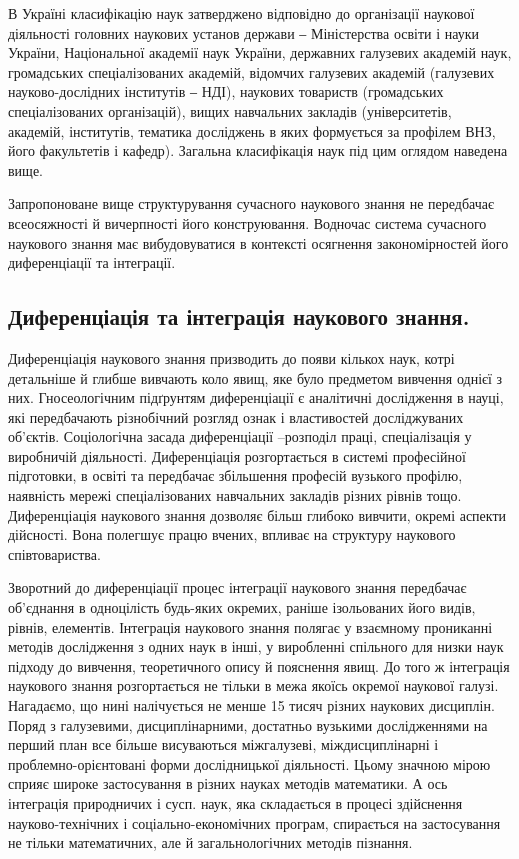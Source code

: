 В Україні класифікацію наук затверджено відповідно до організації
наукової діяльності головних наукових установ держави ‒ Міністерства освіти і
науки України, Національної академії наук України, державних галузевих
академій наук, громадських спеціалізованих академій, відомчих галузевих
академій (галузевих науково-дослідних інститутів ‒ НДІ), наукових товариств
(громадських спеціалізованих організацій), вищих навчальних закладів
(університетів, академій, інститутів, тематика досліджень в яких формується за
профілем ВНЗ, його факультетів і кафедр). Загальна класифікація наук під цим
оглядом наведена вище.

Запропоноване вище структурування сучасного наукового знання не
передбачає всеосяжності й вичерпності його конструювання. Водночас система
сучасного наукового знання має вибудовуватися в контексті осягнення
закономірностей його диференціації та інтеграції.

\subsection{Диференціація та інтеграція наукового знання.} Диференціація
наукового знання призводить до появи кількох наук, котрі детальніше й глибше
вивчають коло явищ, яке було предметом вивчення однієї з них.
Гносеологічним підґрунтям диференціації є аналітичні дослідження в науці, які
передбачають різнобічний розгляд ознак і властивостей досліджуваних
об’єктів. Соціологічна засада диференціації –розподіл праці, спеціалізація у
виробничій діяльності. Диференціація розгортається в системі професійної
підготовки, в освіті та передбачає збільшення професій вузького профілю,
наявність мережі спеціалізованих навчальних закладів різних рівнів тощо.
Диференціація наукового знання дозволяє більш глибоко вивчити, окремі
аспекти дійсності. Вона полегшує працю вчених, впливає на структуру
наукового співтовариства.

Зворотний до диференціації процес інтеграції наукового знання передбачає
об’єднан\-ня в одноцілість будь-яких окремих, раніше ізольованих його видів,
рівнів, елементів. Інтеграція наукового знання полягає у взаємному прониканні
методів дослідження з одних наук в інші, у виробленні спільного для низки
наук підходу до вивчення, теоретичного опису й пояснення явищ. До того ж
інтеграція наукового знання розгортається не тільки в межа якоїсь окремої
наукової галузі. Нагадаємо, що нині налічується не менше 15 тисяч різних
наукових дисциплін. Поряд з галузевими, дисциплінарними, достатньо
вузькими дослідженнями на перший план все більше висуваються міжгалузеві,
міждисциплінарні і проблемно-орієнтовані форми дослідницької діяльності.
Цьому значною мірою сприяє широке застосування в різних науках методів
математики. А ось інтеграція природничих і сусп. наук, яка складається в
процесі здійснення науково-технічних і соціально-економічних програм,
спирається на застосування не тільки математичних, але й загальнологічних
методів пізнання.

